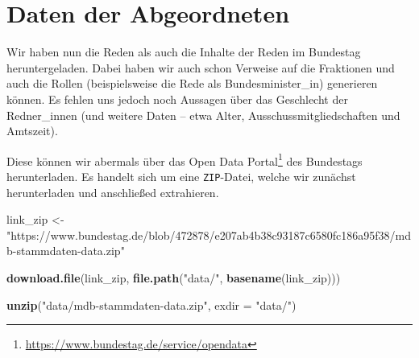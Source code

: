 \documentclass[oneside, 12pt, numbers=endperiod]{scrbook}
\newenvironment{Shaded}{\begin{snugshade}}{\end{snugshade}}
\newcommand{\DataTypeTok}[1]{\textcolor[rgb]{0.13,0.29,0.53}{#1}}
\newcommand{\KeywordTok}[1]{\textcolor[rgb]{0.13,0.29,0.53}{\textbf{#1}}}
\newcommand{\NormalTok}[1]{#1}
\newcommand{\OperatorTok}[1]{\textcolor[rgb]{0.81,0.36,0.00}{\textbf{#1}}}
\newcommand{\StringTok}[1]{\textcolor[rgb]{0.31,0.60,0.02}{#1}}
\theoremstyle{definition}
\theoremstyle{definition}
\theoremstyle{definition}
\theoremstyle{remark}
\begin{document}
\begin{Shaded}
\end{Shaded}

\hypertarget{daten-der-abgeordneten}{%
\section{Daten der Abgeordneten}\label{daten-der-abgeordneten}}

Wir haben nun die Reden als auch die Inhalte der Reden im Bundestag
heruntergeladen. Dabei haben wir auch schon Verweise auf die Fraktionen
und auch die Rollen (beispielsweise die Rede als Bundesminister\_in)
generieren können. Es fehlen uns jedoch noch Aussagen über das
Geschlecht der Redner\_innen (und weitere Daten -- etwa Alter,
Ausschussmitgliedschaften und Amtszeit).

Diese können wir abermals über das Open Data Portal\footnote{\url{https://www.bundestag.de/service/opendata}}
des Bundestags herunterladen. Es handelt sich um eine
\texttt{ZIP}-Datei, welche wir zunächst herunterladen und anschließed
extrahieren.

\begin{Shaded}
\begin{Highlighting}[]
\NormalTok{link_zip <-}\StringTok{ "https://www.bundestag.de/blob/472878/e207ab4b38c93187c6580fc186a95f38/mdb-stammdaten-data.zip"}

\KeywordTok{download.file}\NormalTok{(link_zip, }\KeywordTok{file.path}\NormalTok{(}\StringTok{"data/"}\NormalTok{, }\KeywordTok{basename}\NormalTok{(link_zip)))}

\KeywordTok{unzip}\NormalTok{(}\StringTok{"data/mdb-stammdaten-data.zip"}\NormalTok{, }\DataTypeTok{exdir =} \StringTok{"data/"}\NormalTok{)}
\end{Highlighting}
\end{Shaded}
\end{document}
